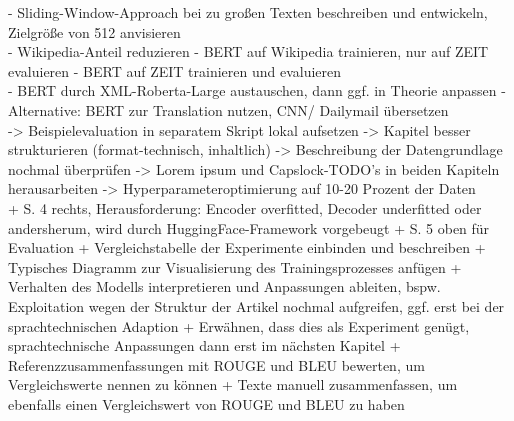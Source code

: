 \noindent
- Sliding-Window-Approach bei zu großen Texten beschreiben und entwickeln, Zielgröße von 512 anvisieren\\

\noindent
- Wikipedia-Anteil reduzieren
- BERT auf Wikipedia trainieren, nur auf ZEIT evaluieren
- BERT auf ZEIT trainieren und evaluieren\\

\noindent
- BERT durch XML-Roberta-Large austauschen, dann ggf. in Theorie anpassen
- Alternative: BERT zur Translation nutzen, CNN/ Dailymail übersetzen\\

\noindent
-> Beispielevaluation in separatem Skript lokal aufsetzen
-> Kapitel besser strukturieren (format-technisch, inhaltlich)
-> Beschreibung der Datengrundlage nochmal überprüfen
-> Lorem ipsum und Capslock-TODO's in beiden Kapiteln herausarbeiten 
-> Hyperparameteroptimierung auf 10-20 Prozent der Daten\\


\noindent
+ \cite{YAN19} S. 4 rechts, Herausforderung: Encoder overfitted, Decoder underfitted oder andersherum, wird durch HuggingFace-Framework vorgebeugt
+ \cite{YAN19} S. 5 oben für Evaluation
+ Vergleichstabelle der Experimente einbinden und beschreiben
+ Typisches Diagramm zur Visualisierung des Trainingsprozesses anfügen
+ Verhalten des Modells interpretieren und Anpassungen ableiten, bspw. Exploitation wegen der Struktur der Artikel nochmal aufgreifen, ggf. erst bei der sprachtechnischen Adaption
+ Erwähnen, dass dies als Experiment genügt, sprachtechnische Anpassungen dann erst im nächsten Kapitel
+ Referenzzusammenfassungen mit ROUGE und BLEU bewerten, um Vergleichswerte nennen zu können
+ Texte manuell zusammenfassen, um ebenfalls einen Vergleichswert von ROUGE und BLEU zu haben\\
